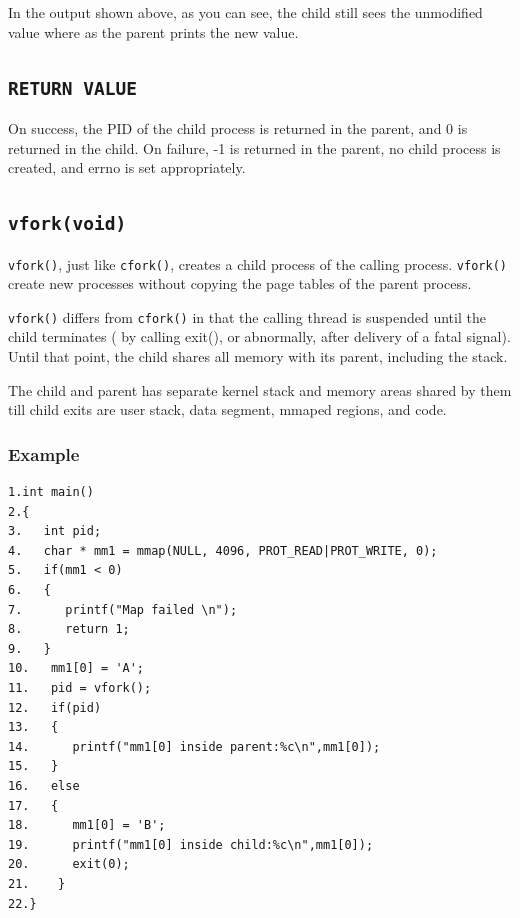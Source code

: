 \documentclass[12pt]{article}
\begin{document}
In the output shown above, as you can see, the child still sees the unmodified value where as the parent prints the new value.

\subsection*{\tt RETURN VALUE}

On success, the PID of the child process is returned in the parent, and 0 is returned in the child. On failure, -1 is returned in the parent, no child process is created, and errno  is  set appropriately.

\subsection*{\texttt{vfork(void)}}

\texttt{vfork()}, just like \texttt{cfork()}, creates a child process of the calling process. \texttt{vfork()} create new processes without copying the page tables of the parent process.

\texttt{vfork()} differs from \texttt{cfork()} in that the calling thread is suspended until the child terminates ( by calling exit(), or abnormally, after delivery of a fatal signal).  Until that point, the child shares all memory with its parent, including the stack.

The child and parent has separate kernel stack and memory areas shared by them till child exits are user stack, data segment, mmaped regions, and code.
 
\subsubsection*{Example}

\begin{verbatim}
1.int main()
2.{
3.   int pid;
4.   char * mm1 = mmap(NULL, 4096, PROT_READ|PROT_WRITE, 0);
5.   if(mm1 < 0)
6.   {
7.      printf("Map failed \n");
8.      return 1;
9.   }
10.   mm1[0] = 'A';
11.   pid = vfork();
12.   if(pid)
13.   {
14.      printf("mm1[0] inside parent:%c\n",mm1[0]);
15.   }
16.   else
17.   {
18.      mm1[0] = 'B';
19.      printf("mm1[0] inside child:%c\n",mm1[0]);
20.      exit(0);
21.    }
22.}
\end{verbatim}
\end{document}
